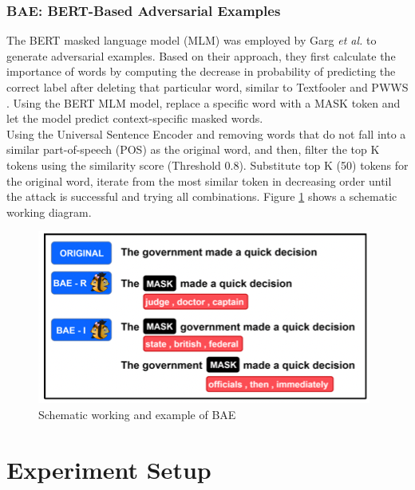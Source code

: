 \documentclass[%
	BCOR=8mm, %
	DIV=12,
	toc=bibliography, %
	toc=listof, %
	oneside, %
	egregdoesnotlikesansseriftitles, %
	]{scrbook}
\begin{document}
\subsection{BAE: BERT-Based Adversarial Examples}
\label{subsection:bae}
The BERT masked language model (MLM) was employed by Garg \textit{et al.} \cite{garg_bae_2020}  to generate adversarial examples. Based on their approach, they first calculate the importance of words by computing the decrease in probability of predicting the correct label after deleting that particular word, similar to Textfooler \cite{jia_certified_2019}  and PWWS \cite{ren_generating_2019}. Using the BERT MLM model, replace a specific word with a MASK token and let the model predict context-specific masked words. \\
Using the Universal Sentence Encoder \cite{cer_universal_2018} and removing words that do not fall into a similar part-of-speech (POS) as the original word, and then, filter the top K tokens using the similarity score (Threshold 0.8). Substitute top K (50) tokens for the original word, iterate from the most similar token in decreasing order until the attack is successful and trying all combinations. Figure \ref{diag:baeexp} shows a schematic working diagram.
\begin{figure}[H]
    \centering
    \includegraphics[width=.60\textwidth]{img/BAEexample.png}
    \caption[Schematic working and example of BAE attack recipe]{Schematic working and example of BAE \cite{garg_bae_2020} }
    \label{diag:baeexp}
\end{figure}
 
\chapter{Experiment Setup}
\label{chapter:experiment}
\end{document}
